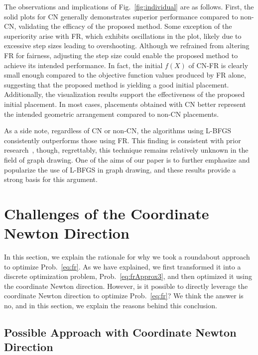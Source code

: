 \documentclass[dvipdfmx,10pt,journal,compsoc]{IEEEtran}
\begin{document}
The observations and implications of Fig.~\ref{fig:individual} are as follows.
First, the solid plots for \textsf{CN} generally demonstrates superior performance compared to non-\textsf{CN}, validating the efficacy of the proposed method.
Some exception of the superiority arise with \textsf{FR}, which exhibits oscillations in the plot, likely due to excessive step sizes leading to overshooting.
Although we refrained from altering \textsf{FR} for fairness, adjusting the step size could enable the proposed method to achieve its intended performance.
In fact, the initial $f(X)$ of \textsf{CN-FR} is clearly small enough compared to the objective function values produced by \textsf{FR} alone, suggesting that the proposed method is yielding a good initial placement.
Additionally, the visualization results support the effectiveness of the proposed initial placement. In most cases, placements obtained with \textsf{CN} better represent the intended geometric arrangement compared to non-\textsf{CN} placements.

As a side note, regardless of \textsf{CN} or non-\textsf{CN}, the algorithms using \textsf{L-BFGS} consistently outperforms those using \textsf{FR}.
This finding is consistent with prior research~\cite{6183577}, though, regrettably, this technique remains relatively unknown in the field of graph drawing.
One of the aims of our paper is to further emphasize and popularize the use of \textsf{L-BFGS} in graph drawing, and these results provide a strong basis for this argument.

\section{Challenges of the Coordinate Newton Direction}\label{sec:challenges}

In this section, we explain the rationale for why we took a roundabout approach to optimize Prob.~\eqref{eq:fr}.
As we have explained, we first transformed it into a discrete optimization problem, Prob.~\eqref{eq:frApprox3}, and then optimized it using the coordinate Newton direction. However, is it possible to directly leverage the coordinate Newton direction to optimize Prob.~\eqref{eq:fr}?
We think the answer is no, and in this section, we explain the reasons behind this conclusion.

\subsection{Possible Approach with Coordinate Newton Direction}\label{ssec:possibleApproach}
\end{document}
